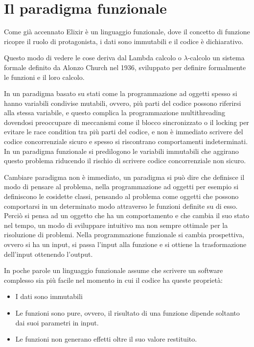 \section{Il paradigma funzionale}
Come già accennato Elixir è un linguaggio funzionale, dove
il concetto di funzione ricopre il ruolo di protagonista,
i dati sono immutabili e il codice è dichiarativo.

Questo modo di vedere le cose deriva dal Lambda calcolo o $\lambda$-calcolo
\cite{Lambdaca75:online}
un sistema formale definito da Alonzo Church nel 1936, sviluppato
per definire formalmente le funzioni e il loro calcolo.

In un paradigma basato su stati come la programmazione ad oggetti
spesso si hanno variabili condivise mutabili, ovvero, più parti del codice
possono riferirsi alla stessa variabile, e questo complica la programmazione
multithreading dovendosi preoccupare di meccanismi come il blocco
sincronizzato o il locking per evitare le race condition tra più parti
del codice, e non è immediato scrivere del codice concorrenziale sicuro
e spesso si riscontrano comportamenti indeterminati.
In un paradigma funzionale si predilogono le variabili immutabili che
aggirano questo problema riducendo il rischio di scrivere codice
concorrenziale non sicuro.

Cambiare paradigma non è immediato, un paradigma si può dire che
definisce il modo di pensare al problema, nella programmazione ad
oggetti per esempio si definiscono le cosidette classi,
pensando al problema come oggetti che possono comportarsi in un
determinato modo attraverso le funzioni definite su di esso.
Perciò si pensa ad un oggetto che ha un comportamento e che cambia
il suo stato nel tempo, un modo di sviluppare intuitivo ma non sempre
ottimale per la risoluzione di problemi. Nella programmazione funzionale
si cambia prospettiva, ovvero si ha un input, si passa l'input 
alla funzione e si ottiene la trasformazione dell'input ottenendo
l'output.

In poche parole un linguaggio funzionale assume che scrivere un
software complesso sia più facile nel momento in cui il codice ha
queste proprietà:
\begin{itemize}
    \item I dati sono immutabili
    \item Le funzioni sono pure, ovvero, il risultato di una funzione
    dipende soltanto dai suoi parametri in input.
    \item Le funzioni non generano effetti oltre il suo valore restituito.
\end{itemize}

